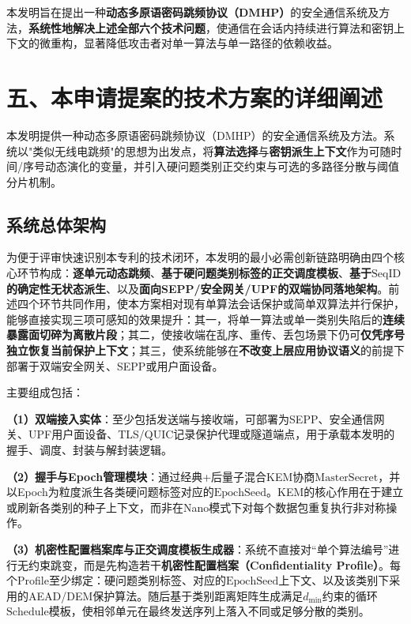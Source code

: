 ﻿\documentclass[12pt,a4paper]{article}
\begin{document}
本发明旨在提出一种\textbf{动态多原语密码跳频协议（DMHP）}的安全通信系统及方法，\textbf{系统性地解决上述全部六个技术问题}，使通信在会话内持续进行算法和密钥上下文的微重构，显著降低攻击者对单一算法与单一路径的依赖收益。

\section*{五、本申请提案的技术方案的详细阐述}

本发明提供一种动态多原语密码跳频协议（DMHP）的安全通信系统及方法。系统以"类似无线电跳频"的思想为出发点，将\textbf{算法选择}与\textbf{密钥派生上下文}作为可随时间/序号动态演化的变量，并引入硬问题类别正交约束与可选的多路径分散与阈值分片机制。

\subsection*{系统总体架构}

为便于评审快速识别本专利的技术闭环，本发明的最小必需创新链路明确由四个核心环节构成：\textbf{逐单元动态跳频}、\textbf{基于硬问题类别标签的正交调度模板}、\textbf{基于$\text{SeqID}$的确定性无状态派生}、以及\textbf{面向SEPP/安全网关/UPF的双端协同落地架构}。前述四个环节共同作用，使本方案相对现有单算法会话保护或简单双算法并行保护，能够直接实现三项可感知的效果提升：其一，将单一算法或单一类别失陷后的\textbf{连续暴露面切碎为离散片段}；其二，使接收端在乱序、重传、丢包场景下仍可\textbf{仅凭序号独立恢复当前保护上下文}；其三，使系统能够在\textbf{不改变上层应用协议语义}的前提下部署于双端安全网关、SEPP或用户面设备。

主要组成包括：

\textbf{（1）双端接入实体}：至少包括发送端与接收端，可部署为SEPP、安全通信网关、UPF用户面设备、TLS/QUIC记录保护代理或隧道端点，用于承载本发明的握手、调度、封装与解封装逻辑。

\textbf{（2）握手与Epoch管理模块}：通过经典+后量子混合KEM协商$\text{MasterSecret}$，并以Epoch为粒度派生各类硬问题标签对应的$\text{EpochSeed}$。KEM的核心作用在于建立或刷新各类别的种子上下文，而非在Nano模式下对每个数据包重复执行非对称操作。

\textbf{（3）机密性配置档案库与正交调度模板生成器}：系统不直接对“单个算法编号”进行无约束跳变，而是先构造若干\textbf{机密性配置档案（Confidentiality Profile）}。每个Profile至少绑定：硬问题类别标签、对应的$\text{EpochSeed}$上下文、以及该类别下采用的AEAD/DEM保护算法。随后基于类别距离矩阵生成满足$d_{\min}$约束的循环$\text{Schedule}$模板，使相邻单元在最终发送序列上落入不同或足够分散的类别。
\end{document}
